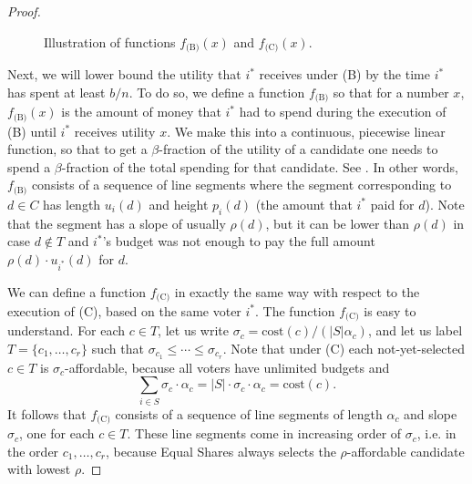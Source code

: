 \documentclass[10pt]{scrartcl}
\renewcommand*{\le}{\leqslant}
\newcommand{\cost}{{{\mathrm{cost}}}}
\theoremstyle{definition}
\theoremstyle{plain}
\begin{document}
\begin{proof}
\begin{figure}[ht]
{}
		\caption{Illustration of functions $f_{\text{(B)}}(x)$ and $f_{\text{(C)}}(x)$.}
		\label{fig:fB-fC}
	\end{figure}
	
	Next, we will lower bound the utility that $i^*$ receives under (B) by the time $i^*$ has spent at least $b/n$. To do so, we define a function $f_{\text{(B)}}$ so that for a number $x$, $f_{\text{(B)}}(x)$ is the amount of money that $i^*$ had to spend during the execution of (B) until $i^*$ receives utility $x$. We make this into a continuous, piecewise linear function, so that to get a $\beta$-fraction of the utility of a candidate one needs to spend a $\beta$-fraction of the total spending for that candidate. See . In other words, $f_{\text{(B)}}$ consists of a sequence of line segments where the segment corresponding to $d \in C$ has length $u_i(d)$ and height $p_i(d)$ (the amount that $i^*$ paid for $d$). Note that the segment has a slope of usually $\rho(d)$, but it can be lower than $\rho(d)$ in case $d \not \in T$ and $i^*$'s budget was not enough to pay the full amount $\rho(d) \cdot u_{i^*}(d)$ for $d$.
	
	We can define a function $f_{\text{(C)}}$ in exactly the same way with respect to the execution of (C), based on the same voter $i^*$. The function $f_{\text{(C)}}$ is easy to understand. For each $c \in T$, let us write $\sigma_c = \cost(c)/(|S|\alpha_c)$, and let us label $T = \{c_1, \dots, c_r\}$ such that $\sigma_{c_1} \le \cdots \le \sigma_{c_r}$. Note that under (C) each not-yet-selected $c \in T$ is $\sigma_c$-affordable, because all voters have unlimited budgets and
	\[
	\sum_{i \in S} \sigma_c \cdot \alpha_c = |S| \cdot \sigma_c \cdot \alpha_c = \cost(c).
	\]
	It follows that $f_{\text{(C)}}$ consists of a sequence of line segments of length $\alpha_c$ and slope $\sigma_c$, one for each $c \in T$. These line segments come in increasing order of $\sigma_c$, i.e. in the order $c_1, \dots, c_r$, because Equal Shares always selects the $\rho$-affordable candidate with lowest $\rho$.
	

\end{proof}
\end{document}
